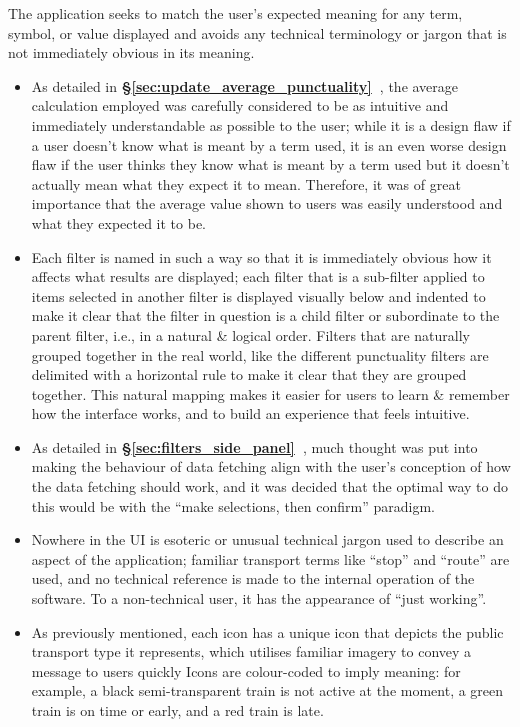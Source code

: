 \documentclass[a4paper,11pt]{report}
\newcommand{\secref}[1]{\textbf{§\ref{#1}~\nameref{#1}}}
\begin{document}
The application seeks to match the user's expected meaning for any term, symbol, or value displayed and avoids any technical terminology or jargon that is not immediately obvious in its meaning.
\begin{itemize}
    \item   As detailed in \secref{sec:update_average_punctuality}, the average calculation employed was carefully considered to be as intuitive and immediately understandable as possible to the user;
            while it is a design flaw if a user doesn't know what is meant by a term used, it is an even worse design flaw if the user thinks they know what is meant by a term used but it doesn't actually mean what they expect it to mean.
            Therefore, it was of great importance that the average value shown to users was easily understood and what they expected it to be.

    \item   Each filter is named in such a way so that it is immediately obvious how it affects what results are displayed;
            each filter that is a sub-filter applied to items selected in another filter is displayed visually below and indented to make it clear that the filter in question is a child filter or subordinate to the parent filter, i.e., in a natural \& logical order.
            Filters that are naturally grouped together in the real world, like the different punctuality filters are delimited with a horizontal rule to make it clear that they are grouped together.
            This natural mapping\supercite{naturalmapping} makes it easier for users to learn \& remember how the interface works, and to build an experience that feels intuitive.

    \item   As detailed in \secref{sec:filters_side_panel}, much thought was put into making the behaviour of data fetching align with the user's conception of how the data fetching should work, and it was decided that the optimal way to do this would be with the ``make selections, then confirm'' paradigm.

    \item   Nowhere in the UI is esoteric or unusual technical jargon used to describe an aspect of the application;
            familiar transport terms like ``stop'' and ``route'' are used, and no technical reference is made to the internal operation of the software.
            To a non-technical user, it has the appearance of ``just working''.

    \item   As previously mentioned, each icon has a unique icon that depicts the public transport type it represents, which utilises familiar imagery to convey a message to users quickly
            Icons are colour-coded to imply meaning: for example, a black semi-transparent train is not active at the moment, a green train is on time or early, and a red train is late.


\end{itemize}
\end{document}
